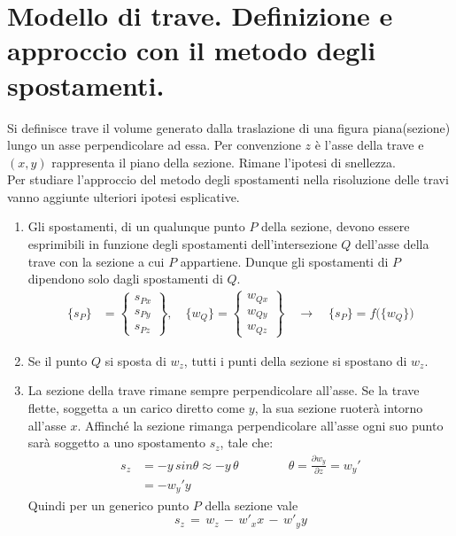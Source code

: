\section{Modello di trave. Definizione e approccio con il metodo degli spostamenti.}

Si definisce trave il volume generato dalla traslazione di una figura piana(sezione) lungo un asse perpendicolare ad essa. Per convenzione $z$ è l'asse della trave e $(x,y)$ rappresenta il piano della sezione. Rimane l'ipotesi di snellezza.\\

Per studiare l'approccio del metodo degli spostamenti nella risoluzione delle travi vanno aggiunte ulteriori ipotesi esplicative.
\begin{enumerate}
    \item Gli spostamenti, di un qualunque punto $P$ della sezione, devono essere esprimibili in funzione degli spostamenti dell'intersezione $Q$ dell'asse della trave con la sezione a cui $P$ appartiene. Dunque gli spostamenti di $P$ dipendono solo dagli spostamenti di $Q$.
    \begin{align*}
    \{s_P\} &= \begin{Bmatrix} s_{Px} \\ s_{Py} \\ s_{Pz} \end{Bmatrix}, \quad
    \{w_Q\} = \begin{Bmatrix} w_{Qx} \\ w_{Qy} \\ w_{Qz}  \end{Bmatrix}
    \quad \rightarrow \quad
    \{s_P\} = f\big( \{w_Q\} \big)
\end{align*}
    \item Se il punto $Q$ si sposta di $w_{z}$, tutti i punti della sezione si spostano di $w_{z}$.
    \item La sezione della trave rimane sempre perpendicolare all'asse. Se la trave flette, soggetta a un carico diretto come $y$, la sua sezione ruoterà intorno all'asse $x$. Affinché la sezione rimanga perpendicolare all'asse ogni suo punto sarà soggetto a uno spostamento $s_z$, tale che:
    \begin{align*}
        s_z &= -y\, sin\theta \approx -y \,\theta    \quad \quad \quad \quad \theta = \frac{\partial w_y}{\partial z} = w_y'\\
        &= -w_y'  y
    \end{align*}
    Quindi per un generico punto $P$ della sezione vale
    \begin{equation*}
        s_z \,=\,  w_z \,-\,w'_x  x\, -\,w'_y  y
    \end{equation*}


\end{enumerate}



